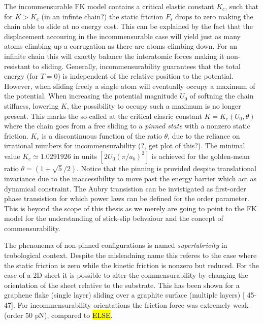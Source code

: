 The incommensurable FK model contains a critical elastic constant $K_c$, such
that for $K > K_c$ (in an infinte chain?) the static friction $F_s$ drops to zero
making the chain able to slide at no energy cost. This can be explained by the
fact that the displacement accouring in the incommensurable case will yield just
as many atoms climbing up a corrugation as there are atoms climbing down. For an
infinite chain this will exactly balance the interatomic forces making it
non-resistant to sliding. Generally, incommensurability guarantees that the
total energy (for $T=0$) is independent of the relative position to the
potential. However, when sliding freely a single atom will eventually occupy a
maximum of the potential. When increasing the potential magnitude $U_0$ of
softning the chain stiffness, lowering $K$, the possibility to occupy such a
maximum is no longer present. This marks the so-called 
at the critical elasric constant $K = K_c(U_0, \theta)$ where the chain goes
from a free sliding to a \textit{pinned state} with a nonzero static friction.
$K_c$ is a discontinuous function of the ratio $\theta$, due to the reliance on
irrational numbers for incommensurability (?, get plot of this?). The minimal
value $K_c \simeq 1.0291926 $ in units $[2 U_0 (\pi / a_b)^2]$ is achieved for
the golden-mean ratio $\theta = (1+\sqrt{5}/2)$. Notice that the pinning is
provided despite translational invariance due to the inaccessibility to move
past the energy barrier which act as dynamical constraint. The Aubry transistion
can be invistigated as first-order phase transistion for which power laws can be
defined for the order parameter. This is beyond the scope of this thesis as we
merely are going to point to the FK model for the understanding of stick-slip
behvaiour and the concept of commensurability.

The phenonema of non-pinned configurations is named \textit{superlubricity} in
trobological context. Despite the misleadning name this referes to the case
where the static friction is zero while the kinetic friction is nonzero but
reduced. For the case of a 2D sheet it is possible to alter the commensurability
by changing the orientation of the sheet relative to the substrate. This has
been shown for a graphene flake (single layer) sliding over a graphite surface
(multiple layers) [\cite{Manini_2016} 45-47]. For incommensurability
orientations the friction force was extremely weak (order 50 pN), compared to
\hl{ELSE}. 







